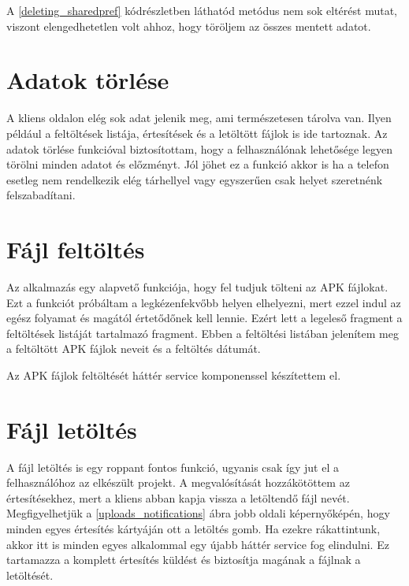 \documentclass{thesis-ekf}
\theoremstyle{definition}
\theoremstyle{remark}
\begin{document}


A \ref{deleting_sharedpref} kódrészletben láthatód metódus nem sok eltérést mutat, viszont elengedhetetlen volt ahhoz, hogy töröljem az összes mentett adatot.



\section{Adatok törlése}

A kliens oldalon elég sok adat jelenik meg, ami természetesen tárolva van.
Ilyen például a feltöltések listája, értesítések és a letöltött fájlok is ide tartoznak.
Az adatok törlése funkcióval biztosítottam, hogy a felhasználónak lehetősége legyen törölni minden adatot és előzményt.
Jól jöhet ez a funkció akkor is ha a telefon esetleg nem rendelkezik elég tárhellyel vagy egyszerűen csak helyet szeretnénk felszabadítani.

\section{Fájl feltöltés}

Az alkalmazás egy alapvető funkciója, hogy fel tudjuk tölteni az APK fájlokat.
Ezt a funkciót próbáltam a legkézenfekvőbb helyen elhelyezni, mert ezzel indul az egész folyamat és magától értetődőnek kell lennie.
Ezért lett a legeleső fragment a feltöltések listáját tartalmazó fragment.
Ebben a feltöltési listában jelenítem meg a feltöltött APK fájlok neveit és a feltöltés dátumát.

Az APK fájlok feltöltését háttér service komponenssel készítettem el.

\section{Fájl letöltés}

A fájl letöltés is egy roppant fontos funkció, ugyanis csak így jut el a felhasználóhoz az elkészült projekt.
A megvalósítását hozzákötöttem az értesítésekhez, mert a kliens abban kapja vissza a letöltendő fájl nevét.
Megfigyelhetjük a \ref{uploads_notifications} ábra jobb oldali képernyőképén, hogy minden egyes értesítés kártyáján ott a letöltés gomb.
Ha ezekre rákattintunk, akkor itt is minden egyes alkalommal egy újabb háttér service fog elindulni.
Ez tartamazza a komplett értesítés küldést és biztosítja magának a fájlnak a letöltését.
\end{document}
